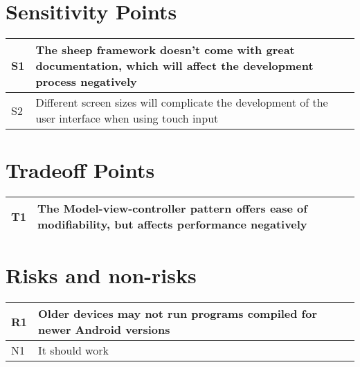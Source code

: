\section{Sensitivity Points}

\begin{tabular}{|m{}|m{}|}
  \hline
  S1 & The sheep framework doesn't come with great documentation, which will affect the development process negatively \\ \hline
  S2 & Different screen sizes will complicate the development of the user interface when using touch input \\ \hline
\end{tabular}

\section{Tradeoff Points}
\begin{tabular}{|m{}|m{}|}
  \hline
  T1 & The Model-view-controller pattern offers ease of modifiability, but affects performance negatively \\ \hline
\end{tabular}

\section{Risks and non-risks}
\begin{tabular}{|m{}|m{}|}
  \hline
  R1 & Older devices may not run programs compiled for newer Android versions \\ \hline
  N1 & It should work \\ \hline
\end{tabular}
